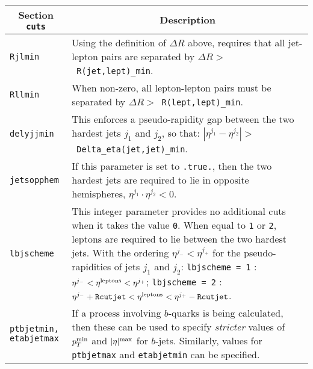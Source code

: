 	\begin{longtable}{p{1.5cm}p{12cm}}
		\toprule
		\multicolumn{1}{c}{{\textbf{Section} \texttt{cuts}}} & \multicolumn{1}{c}{{\textbf{Description}}} \\ 
		\midrule
		{\tt Rjlmin} & Using the definition of $\Delta R$ above,
		requires that all jet-lepton pairs are separated by
		$\Delta R >$~{\tt R(jet,lept)\_min}. \\
		
		{\tt Rllmin} & When non-zero, all lepton-lepton pairs
		must be separated by $\Delta R >$~{\tt R(lept,lept)\_min}. \\
		
		{\tt delyjjmin} & This enforces a pseudo-rapidity
		gap between the two hardest jets $j_1$ and $j_2$, so that:
		$|\eta^{j_1} - \eta^{j_2}| >$~{\tt Delta\_eta(jet,jet)\_min}. \\
		
		{\tt jetsopphem} & If this parameter is set to {\tt .true.},
		then the two hardest jets are required to lie in opposite hemispheres,
		$\eta^{j_1} \cdot \eta^{j_2} < 0$. \\
		
		{\tt lbjscheme} & This integer parameter provides no
		additional cuts when it takes the value {\tt 0}. When equal to
		{\tt 1} or {\tt 2}, leptons are required to lie between the two
		hardest jets. With the ordering $\eta^{j_-} < \eta^{j_+}$ for the
		pseudo-rapidities of jets $j_1$ and $j_2$:
		{\tt lbjscheme = 1} : 
		$\eta^{j_-} < \eta^{\rm leptons} < \eta^{j_+}$;
		{\tt lbjscheme = 2} :
		$\eta^{j_-}+{\tt Rcutjet} < \eta^{\rm leptons} < \eta^{j_+}-{\tt Rcutjet}$. \\
		
		{\tt ptbjetmin, etabjetmax} & If a process involving $b$-quarks is being calculated, then these can
		be used to specify {\em stricter} values of $p_T^{\rm min}$
		and $|\eta|^{\rm max}$ for $b$-jets. Similarly, values for \texttt{ptbjetmax} and \texttt{etabjetmin} can be 
		specified. \\
		\bottomrule
	\end{longtable}



